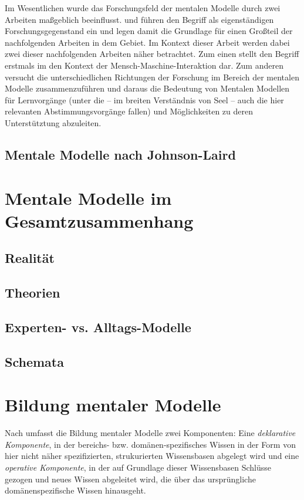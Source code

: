 Im Wesentlichen wurde das Forschungsfeld der mentalen Modelle durch zwei Arbeiten maßgeblich beeinflusst. \citet{Johnson-Laird81} und \citet{de-Kleer81} führen den Begriff als eigenständigen Forschungsgegenstand ein und legen damit die Grundlage für einen Großteil der nachfolgenden Arbeiten in dem Gebiet. Im Kontext dieser Arbeit werden dabei zwei dieser nachfolgenden Arbeiten näher betrachtet. Zum einen stellt \citet{Norman83} den Begriff erstmals im den Kontext der Mensch-Maschine-Interaktion dar. Zum anderen versucht \citet{Seel91} die unterschiedlichen Richtungen der Forschung im Bereich der mentalen Modelle zusammenzuführen und daraus die Bedeutung von Mentalen Modellen für Lernvorgänge (unter die -- im breiten Verständnis von Seel -- auch die hier relevanten Abstimmungsvorgänge fallen) und Möglichkeiten zu deren Unterstütztung abzuleiten.

\subsection{Mentale Modelle nach Johnson-Laird}

\section{Mentale Modelle im Gesamtzusammenhang}

\subsection{Realität}

\subsection{Theorien}

\subsection{Experten- vs. Alltags-Modelle}

\subsection{Schemata}


\section{Bildung mentaler Modelle} %
\label{sec:bildung_mentaler_modelle}

Nach \citep{Seel91} umfasst die Bildung mentaler Modelle zwei Komponenten: Eine \emph{deklarative Komponente}, in der bereichs- bzw. domänen-spezifisches Wissen in der Form von hier nicht näher spezifizierten, strukurierten Wissensbasen abgelegt wird und eine \emph{operative Komponente}, in der auf Grundlage dieser Wissensbasen Schlüsse gezogen und neues Wissen abgeleitet wird, die über das ursprüngliche domänenspezifische Wissen hinausgeht. 

